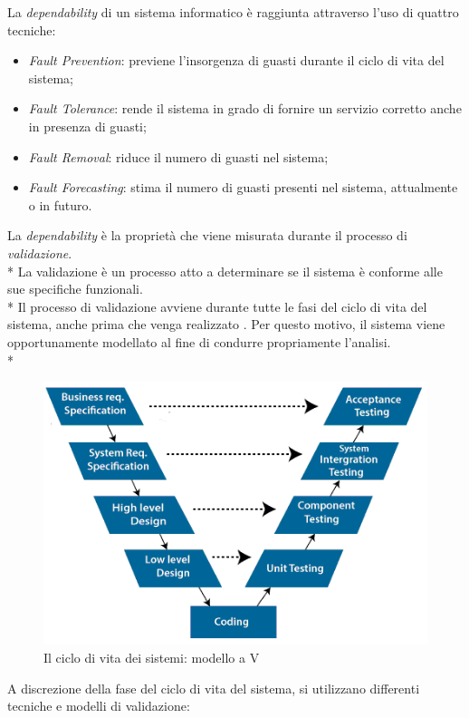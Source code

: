 La \emph{dependability} di un sistema informatico \`e raggiunta attraverso l'uso di quattro tecniche:
\begin{itemize}
	\item \emph{Fault Prevention}: previene l'insorgenza di guasti durante il ciclo di vita del sistema;
	\item \emph{Fault Tolerance}: rende il sistema in grado di fornire un servizio corretto anche in presenza di guasti;
	\item \emph{Fault Removal}: riduce il numero di guasti nel sistema;
	\item \emph{Fault Forecasting}: stima il numero di guasti presenti nel sistema, attualmente o in futuro.
\end{itemize}
La \emph{dependability} \`e la propriet\`a che viene misurata durante il processo di \emph{validazione}.\\*
La validazione \`e un processo atto a determinare se il sistema \`e conforme alle sue specifiche funzionali.\\*
Il processo di validazione avviene durante tutte le fasi del ciclo di vita del sistema, anche prima che venga realizzato \cite{50126}. Per questo motivo, il sistema viene opportunamente modellato al fine di condurre propriamente l'analisi.\\*
\begin{figure}[h]
	\centering
	\includegraphics[width=0.7\linewidth]{img/vmodel}
	\caption{Il ciclo di vita dei sistemi: modello a V}
	\label{fig:vmodel}
\end{figure}
\noindent{}A discrezione della fase del ciclo di vita del sistema, si utilizzano differenti tecniche e modelli di validazione: \cite{librobonda}
